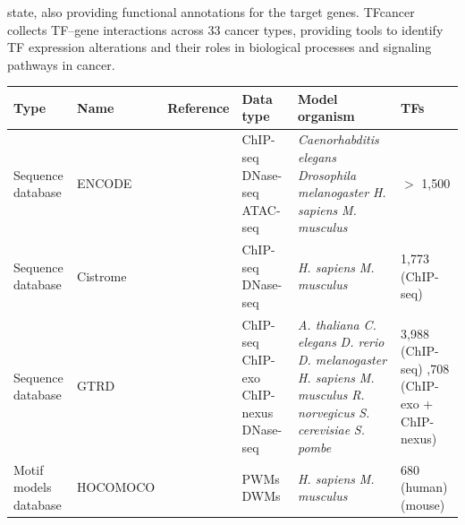 \documentclass[a4paper, titlepage, openright]{book}
\begin{document}
state, also providing functional annotations for the target genes. TFcancer \citep{huang2021tfcancer} collects TF–gene interactions across 33 cancer types, providing tools to identify TF expression alterations and their roles in biological processes and signaling pathways in cancer.

\begin{table}
	\centering
	\begin{tabular}{|p{2cm}|p{2cm}|p{3cm}|p{2cm}|p{4cm}|p{2cm}|}
		\hline
		\textbf{Type}& \textbf{Name}&\textbf{Reference}&\textbf{Data type}& \textbf{Model organism}& \textbf{TFs} \\
		\hline
		Sequence database & ENCODE & \citep{encode2012integrated} & ChIP-seq \newline DNase-seq \newline ATAC-seq & \emph{Caenorhabditis elegans} \newline \emph{Drosophila melanogaster} \newline \emph{H. sapiens} \newline \emph{M. musculus} & $>$ 1,500 \\
		\hline
		Sequence database & Cistrome & \citep{zheng2019cistrome} & ChIP-seq \newline DNase-seq & \emph{H. sapiens} \newline \emph{M. musculus} & 1,773 (ChIP-seq) \\
		\hline
		Sequence database & GTRD & \citep{kolmykov2021gtrd} & ChIP-seq \newline ChIP-exo \newline ChIP-nexus \newline DNase-seq & \emph{A. thaliana} \newline \emph{C. elegans} \newline \emph{D. rerio}  \newline \emph{D. melanogaster} \newline \emph{H. sapiens} \newline \emph{M. musculus} \newline \emph{R. norvegicus} \newline \emph{S. cerevisiae} \newline \emph{S. pombe}  & 3,988 (ChIP-seq) \newline 1,708 (ChIP-exo + ChIP-nexus) \\
		\hline
		Motif models database & HOCOMOCO & \citep{kulakovskiy2013hocomoco, kulakovskiy2018hocomoco} & PWMs \newline DWMs & \emph{H. sapiens} \newline \emph{M. musculus} & 680 (human) \newline 453 (mouse) \\

\end{tabular}
\end{table}
\end{document}
